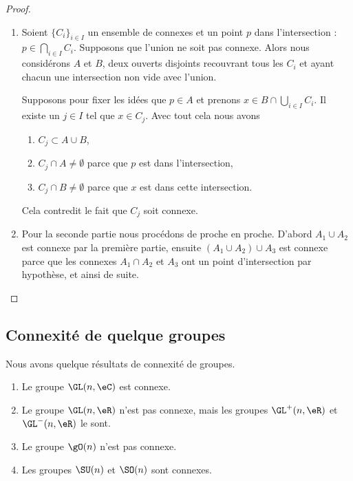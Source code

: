 \begin{proof}
    \begin{enumerate}
        \item
    Soient \( \{ C_i \}_{i\in I}\) un ensemble de connexes et un point \( p\) dans l'intersection : \( p\in\bigcap_{i\in I}C_i\). Supposons que l'union ne soit pas connexe. Alors nous considérons \( A\) et \( B\), deux ouverts disjoints recouvrant tous les \( C_i\) et ayant chacun une intersection non vide avec l'union.

    Supposons pour fixer les idées que \( p\in A\) et prenons \( x\in B\cap\bigcup_{i\in I}C_i\). Il existe un \( j\in I\) tel que \( x\in C_j\). Avec tout cela nous avons
    \begin{enumerate}
        \item
            \( C_j\subset A\cup B\),
        \item
            \( C_j\cap A\neq \emptyset\) parce que \( p\) est dans l'intersection,
        \item
            \( C_j\cap B\neq\emptyset\) parce que \( x\) est dans cette intersection.
    \end{enumerate}
    Cela contredit le fait que \( C_j\) soit connexe.

\item

    Pour la seconde partie nous procédons de proche en proche. D'abord \( A_1\cup A_2\) est connexe par la première partie, ensuite \( (A_1\cup A_2)\cup A_3\) est connexe parce que les connexes \( A_1\cap A_2\) et \( A_3\) ont un point d'intersection par hypothèse, et ainsi de suite.
    \end{enumerate}
\end{proof}

\subsection{Connexité de quelque groupes}

\begin{proposition} \label{PropIFabDZz}
    Nous avons quelque résultats de connexité de groupes.
    \begin{enumerate}
        \item
            Le groupe \( \GL(n,\eC)\) est connexe.
        \item
            Le groupe \( \GL(n,\eR)\) n'est pas connexe, mais les groupes \( \GL^+(n,\eR)\) et \( \GL^-(n,\eR)\) le sont.
        \item
            Le groupe \( \gO(n)\) n'est pas connexe.
        \item
            Les groupes \( \SU(n)\) et \( \SO(n)\) sont connexes.
    \end{enumerate}
\end{proposition}


